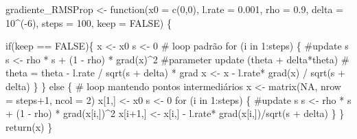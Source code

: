 \documentclass[
  a4paperpaper,
]{article}
\newenvironment{Shaded}{\begin{snugshade}}{\end{snugshade}}
\newcommand{\AttributeTok}[1]{\textcolor[rgb]{0.40,0.45,0.13}{#1}}
\newcommand{\CommentTok}[1]{\textcolor[rgb]{0.37,0.37,0.37}{#1}}
\newcommand{\ConstantTok}[1]{\textcolor[rgb]{0.56,0.35,0.01}{#1}}
\newcommand{\ControlFlowTok}[1]{\textcolor[rgb]{0.00,0.23,0.31}{#1}}
\newcommand{\DecValTok}[1]{\textcolor[rgb]{0.68,0.00,0.00}{#1}}
\newcommand{\FloatTok}[1]{\textcolor[rgb]{0.68,0.00,0.00}{#1}}
\newcommand{\FunctionTok}[1]{\textcolor[rgb]{0.28,0.35,0.67}{#1}}
\newcommand{\NormalTok}[1]{\textcolor[rgb]{0.00,0.23,0.31}{#1}}
\newcommand{\OtherTok}[1]{\textcolor[rgb]{0.00,0.23,0.31}{#1}}
\newcommand{\SpecialCharTok}[1]{\textcolor[rgb]{0.37,0.37,0.37}{#1}}
\begin{document}
\begin{Shaded}
\begin{Highlighting}[]
\NormalTok{gradiente\_RMSProp }\OtherTok{\textless{}{-}} \ControlFlowTok{function}\NormalTok{(}\AttributeTok{x0 =} \FunctionTok{c}\NormalTok{(}\DecValTok{0}\NormalTok{,}\DecValTok{0}\NormalTok{), }\AttributeTok{l.rate =} \FloatTok{0.001}\NormalTok{, }\AttributeTok{rho =} \FloatTok{0.9}\NormalTok{, }\AttributeTok{delta =} \DecValTok{10}\SpecialCharTok{\^{}}\NormalTok{(}\SpecialCharTok{{-}}\DecValTok{6}\NormalTok{), }\AttributeTok{steps =} \DecValTok{100}\NormalTok{, }\AttributeTok{keep =} \ConstantTok{FALSE}\NormalTok{) \{}
  
  \ControlFlowTok{if}\NormalTok{(keep }\SpecialCharTok{==} \ConstantTok{FALSE}\NormalTok{)\{}
\NormalTok{    x }\OtherTok{\textless{}{-}}\NormalTok{ x0}
\NormalTok{    s }\OtherTok{\textless{}{-}} \DecValTok{0}
    \CommentTok{\# loop padrão}
    \ControlFlowTok{for}\NormalTok{ (i }\ControlFlowTok{in} \DecValTok{1}\SpecialCharTok{:}\NormalTok{steps) \{}
      \CommentTok{\#update s}
\NormalTok{      s }\OtherTok{\textless{}{-}}\NormalTok{ rho }\SpecialCharTok{*}\NormalTok{ s }\SpecialCharTok{+}\NormalTok{ (}\DecValTok{1} \SpecialCharTok{{-}}\NormalTok{ rho) }\SpecialCharTok{*} \FunctionTok{grad}\NormalTok{(x)}\SpecialCharTok{\^{}}\DecValTok{2}
      \CommentTok{\#parameter update (theta + delta*theta)}
      \CommentTok{\# theta = theta {-} l.rate / sqrt(s + delta) * grad }
\NormalTok{      x }\OtherTok{\textless{}{-}}\NormalTok{ x }\SpecialCharTok{{-}}\NormalTok{ l.rate}\SpecialCharTok{*} \FunctionTok{grad}\NormalTok{(x) }\SpecialCharTok{/} \FunctionTok{sqrt}\NormalTok{(s }\SpecialCharTok{+}\NormalTok{ delta)}
\NormalTok{    \}}
\NormalTok{  \} }\ControlFlowTok{else}\NormalTok{ \{}
    \CommentTok{\# loop mantendo pontos intermediários}
\NormalTok{    x }\OtherTok{\textless{}{-}} \FunctionTok{matrix}\NormalTok{(}\ConstantTok{NA}\NormalTok{, }\AttributeTok{nrow =}\NormalTok{ steps}\SpecialCharTok{+}\DecValTok{1}\NormalTok{, }\AttributeTok{ncol =} \DecValTok{2}\NormalTok{)}
\NormalTok{    x[}\DecValTok{1}\NormalTok{,] }\OtherTok{\textless{}{-}}\NormalTok{ x0}
\NormalTok{    s }\OtherTok{\textless{}{-}} \DecValTok{0}
    \ControlFlowTok{for}\NormalTok{ (i }\ControlFlowTok{in} \DecValTok{1}\SpecialCharTok{:}\NormalTok{steps) \{}
      \CommentTok{\#update s}
\NormalTok{      s }\OtherTok{\textless{}{-}}\NormalTok{ rho }\SpecialCharTok{*}\NormalTok{ s }\SpecialCharTok{+}\NormalTok{ (}\DecValTok{1} \SpecialCharTok{{-}}\NormalTok{ rho) }\SpecialCharTok{*} \FunctionTok{grad}\NormalTok{(x[i,])}\SpecialCharTok{\^{}}\DecValTok{2}
\NormalTok{      x[i}\SpecialCharTok{+}\DecValTok{1}\NormalTok{,] }\OtherTok{\textless{}{-}}\NormalTok{ x[i,] }\SpecialCharTok{{-}}\NormalTok{ l.rate}\SpecialCharTok{*} \FunctionTok{grad}\NormalTok{(x[i,])}\SpecialCharTok{/}\FunctionTok{sqrt}\NormalTok{(s }\SpecialCharTok{+}\NormalTok{ delta) }
\NormalTok{    \}}
\NormalTok{  \}}
  \FunctionTok{return}\NormalTok{(x)}
\NormalTok{\}}


\end{Highlighting}
\end{Shaded}
\end{document}
